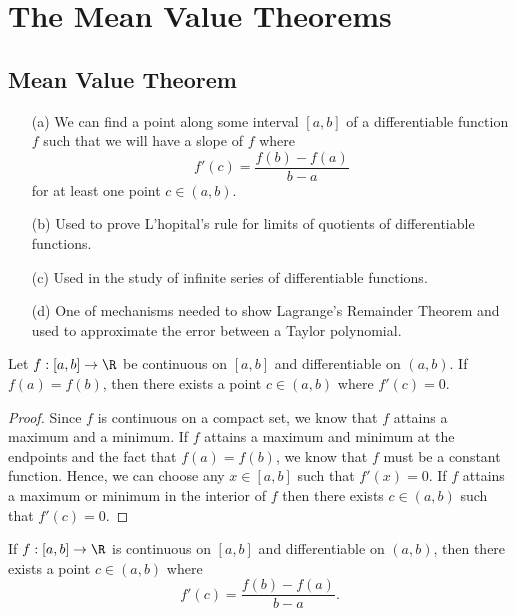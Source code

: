 
\section{The Mean Value Theorems}

\subsection{Mean Value Theorem}

\begin{enumerate}
    \item[(a)] We can find a point along some interval \( [a,b]  \) of a differentiable function \( f  \) such that we will have a slope of \( f  \) where 
        \[  f'(c) = \frac{ f(b) - f(a)  }{  b - a  }  \]
        for at least one point \( c \in (a,b) \).
    \item[(b)] Used to prove L'hopital's rule for limits of quotients of differentiable functions.
    \item[(c)] Used in the study of infinite series of differentiable functions.
    \item[(d)] One of mechanisms needed to show Lagrange's Remainder Theorem and used to approximate the error between a Taylor polynomial.
\end{enumerate}

\begin{tcolorbox}
    \begin{thm}
        Let \( f : [a,b] \to \R  \) be continuous on \( [a,b]  \) and differentiable on \( (a,b)  \). If \( f(a) = f(b) \), then there exists a point \( c \in (a,b)  \) where \( f'(c) = 0  \). 
    \end{thm}
\end{tcolorbox}


\begin{proof}
    Since \( f  \) is continuous on a compact set, we know that \( f  \) attains a maximum and a minimum. If \( f  \) attains a maximum and minimum at the endpoints and the fact that \( f(a) = f(b)  \), we know that \( f  \) must be a constant function. Hence, we can choose any \( x \in [a,b]  \) such that \( f'(x) = 0  \). If \( f  \) attains a maximum or minimum in the interior of \( f  \) then there exists \( c \in (a,b)  \) such that \( f'(c) = 0  \).
\end{proof}

\begin{tcolorbox}
    \begin{thm}
        If \( f: [a,b] \to \R  \) is continuous on \( [a,b]  \) and differentiable on \( (a,b)  \), then there exists a point \( c \in (a,b)  \) where 
        \[  f'(c) = \frac{ f(b) - f(a)  }{ b - a  }. \]
    \end{thm}
\end{tcolorbox}

